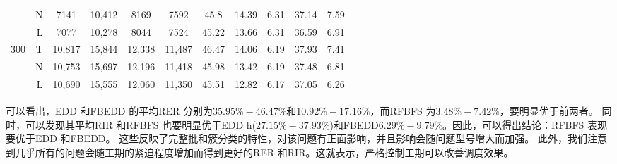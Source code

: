 \begin{table}[h]
\begin{tabular}{crccccccccc}
          & N     & 7141  & 10,412 & 8169  & 7592  & 45.8  & 14.39 & 6.31  & 37.14 & 7.59 \\
          & L     & 7077  & 10,278 & 8044  & 7524  & 45.22 & 13.66 & 6.31  & 36.59 & 6.91 \\[3pt]
    \multirow{3}[1]{*}{300} & T     & 10,817 & 15,844 & 12,338 & 11,487 & 46.47 & 14.06 & 6.19  & 37.93 & 7.41 \\
          & N     & 10,753 & 15,697 & 12,196 & 11,418 & 45.98 & 13.42 & 6.19  & 37.48 & 6.81 \\
          & L     & 10,690 & 15,555 & 12,060 & 11,350 & 45.51 & 12.82 & 6.17  & 37.05 & 6.26 \\
    \bottomrule
    \end{tabular}
\end{table}
可以看出，EDD 和FBEDD 的平均RER 分别为$35.95\% - 46.47\%$和$10.92\% - 17.16\%$，而RFBFS 为$3.48\% - 7.42\%$，要明显优于前两者。
同时，可以发现其平均RIR 和RFBFS 也要明显优于EDD h($27.15\% - 37.93\%$)和FBEDD$6.29\% - 9.79\%$。因此，可以得出结论：RFBFS 表现要优于EDD
 和FBEDD。
这些反映了完整批和簇分类的特性，对该问题有正面影响，并且影响会随问题型号增大而加强。
此外，我们注意到几乎所有的问题会随工期的紧迫程度增加而得到更好的RER 和RIR。这就表示，严格控制工期可以改善调度效果。

